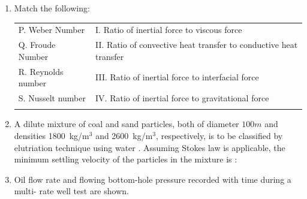 \documentclass[journal,12pt,onecolumn]{IEEEtran}
\theoremstyle{remark}
\begin{document}
\begin{enumerate}
\item Match the following: 

\hfill{}

\begin{tabular}{ll}
P. Weber Number      & I. Ratio of inertial force to viscous force \\
Q. Froude Number     & II. Ratio of convective heat transfer to conductive heat transfer \\
R. Reynolds number   & III. Ratio of inertial force to interfacial force \\
S. Nusselt number    & IV. Ratio of inertial force to gravitational force \\\\
\end{tabular}

\begin{enumerate} 
\end{enumerate}

\item A dilute mixture of coal and sand particles, both of diameter $100m$ and densities 1800~kg/m$^3$ and 2600~kg/m$^3$, respectively, is to be classified by elutriation technique using water . Assuming Stokes law is applicable, the minimum settling velocity of the particles in the mixture is : 

\hfill{}

\begin{enumerate}
\end{enumerate}

\pagebreak

\item Oil flow rate and flowing bottom-hole pressure  recorded with time during a multi-
rate well test are shown.


\end{enumerate}
\end{document}
